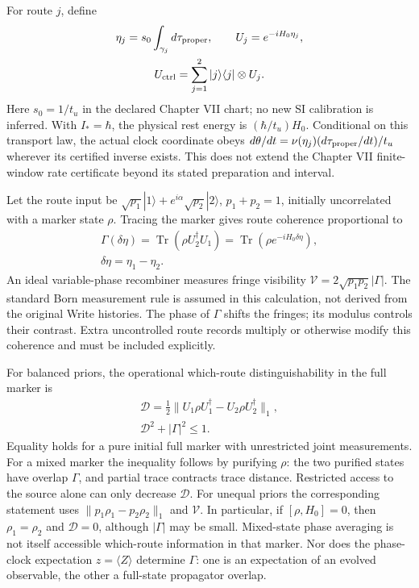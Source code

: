 For route $j$, define
\begin{equation}
 \begin{gathered}
 \eta_j=s_0\int_{\gamma_j}d\tau_{\rm proper},\qquad
 U_j=e^{-iH_0\eta_j},\\
 U_{\rm ctrl}=\sum_{j=1}^2|j\rangle\langle j|\otimes U_j.
 \end{gathered}
 \label{eq:ch6-controlled-clock}
\end{equation}
Here $s_0=1/t_u$ in the declared Chapter VII chart; no new SI calibration is
inferred. With $I_*=\hbar$, the physical rest energy
is $(\hbar/t_u)H_0$. Conditional on this transport law, the actual clock
coordinate obeys $d\theta/dt=\nu(\eta_j)(d\tau_{\rm proper}/dt)/t_u$ wherever
its certified inverse exists. This does not extend the Chapter VII finite-window
rate certificate beyond its stated preparation and interval.

Let the route input be $\sqrt{p_1}|1\rangle+e^{i\alpha}\sqrt{p_2}|2\rangle$,
$p_1+p_2=1$, initially uncorrelated with a marker state $\rho$. Tracing the
marker gives route coherence proportional to
\begin{equation}
\begin{gathered}
\Gamma(\delta\eta)=\operatorname{Tr}(\rho U_2^\dagger U_1)
 =\operatorname{Tr}(\rho e^{-iH_0\delta\eta}),\\
 \delta\eta=\eta_1-\eta_2.
\end{gathered}
\label{eq:ch6-route-overlap}
\end{equation}
An ideal variable-phase recombiner measures fringe visibility
$\mathcal V=2\sqrt{p_1p_2}|\Gamma|$. The standard Born measurement rule is assumed in this calculation, not
derived from the original Write histories. The phase of $\Gamma$ shifts the fringes;
its modulus controls their contrast. Extra uncontrolled route records multiply
or otherwise modify this coherence and must be included explicitly.

For balanced priors, the operational which-route distinguishability in the
full marker is
\begin{equation}
\begin{gathered}
\mathcal D=\tfrac12\|U_1\rho U_1^\dagger-U_2\rho U_2^\dagger\|_1,
 \\
 \mathcal D^2+|\Gamma|^2\leq1.
\end{gathered}
\label{eq:ch6-duality}
\end{equation}
Equality holds for a pure initial full marker with unrestricted joint
measurements. For a mixed marker the inequality follows by purifying $\rho$:
the two purified states have overlap $\Gamma$, and partial trace contracts
trace distance. Restricted access to the source alone can only decrease
$\mathcal D$. For unequal priors the corresponding statement uses
$\|p_1\rho_1-p_2\rho_2\|_1$ and $\mathcal V$.
In particular, if $[\rho,H_0]=0$, then $\rho_1=\rho_2$ and $\mathcal D=0$,
although $|\Gamma|$ may be small. Mixed-state phase averaging is not itself
accessible which-route information in that marker. Nor does the phase-clock
expectation $z=\langle Z\rangle$ determine $\Gamma$: one is an expectation
of an evolved observable, the other a full-state propagator overlap.

